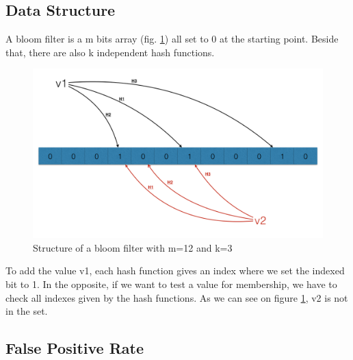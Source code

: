 \documentclass{eplmastersthesis}
\begin{document}
\subsection{Data Structure}
A bloom filter is a m bits array (fig. \ref{bloom-1}) all set to 0 at the starting point. Beside that, there are also k independent hash functions. 

\begin{figure}[h!]
	\begin{center}
		\includegraphics[scale=0.3]{res/bloom-1}
		\caption{Structure of a bloom filter with m=12 and k=3}
		\label{bloom-1}
	\end{center}
\end{figure}

To add the value v1, each hash function gives an index where we set the indexed bit to 1. In the opposite, if we want to test a value for membership, we have to check all indexes given by the hash functions. As we can see on figure \ref{bloom-1}, v2 is not in the set.

\subsection{False Positive Rate}
\end{document}
